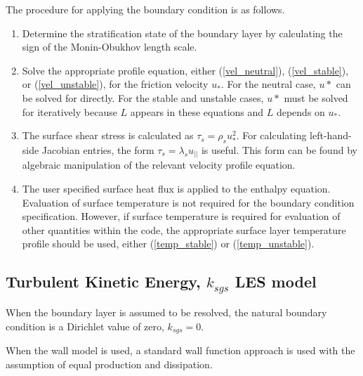The procedure for applying the boundary condition is as follows.
\begin{enumerate}
\item Determine the stratification state of the boundary layer by
  calculating the sign of the Monin-Obukhov length scale.
\item Solve the appropriate profile equation, either
  (\ref{vel_neutral}), (\ref{vel_stable}), or (\ref{vel_unstable}),
  for the friction velocity $u_*$.  For the neutral case, $u*$ can be
  solved for directly.  For the stable and unstable cases, $u*$ must
  be solved for iteratively because $L$ appears in these equations and
  $L$ depends on $u_*$.
\item The surface shear stress is calculated as $\tau_s = \rho_s u_*^2$.
  For calculating left-hand-side Jacobian entries, the form $\tau_s =
  \lambda_s u_{||}$ is useful. This form can be found by algebraic
  manipulation of the relevant velocity profile equation.
\item The user specified surface heat flux is applied to the enthalpy
  equation.  Evaluation of surface temperature is not required for
  the boundary condition specification.  However, if surface
  temperature is required for evaluation of other quantities within
  the code, the appropriate surface layer temperature profile should
  be used, either (\ref{temp_stable}) or (\ref{temp_unstable}).
\end{enumerate}

\subsection{Turbulent Kinetic Energy, $k_{sgs}$ LES model}
When the boundary layer is assumed to be resolved, the natural boundary condition is a Dirichlet value of zero, 
$k_{sgs} = 0$. 

When the wall model is used, a standard wall function approach is used with the assumption of equal production and
dissipation.

